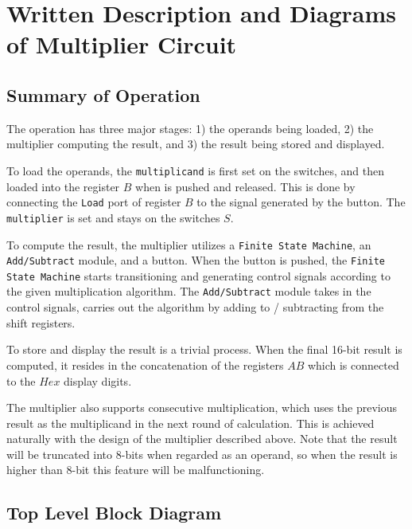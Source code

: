 \documentclass{article}
\begin{document}



\section{Written Description and Diagrams of Multiplier Circuit}
\label{sec:written-description}

\subsection{Summary of Operation}
The operation has three major stages: 1) the operands being loaded, 2) the multiplier computing the result, and 3) the result being stored and displayed.

To load the operands, the \texttt{multiplicand} is first set on the switches, and then loaded into the register $B$ when  is pushed and released. This is done by connecting the \texttt{Load} port of register $B$ to the signal generated by the button. The \texttt{multiplier} is set and stays on the switches $S$. 

To compute the result, the multiplier utilizes a \texttt{Finite State Machine}, an \texttt{Add/Subtract} module, and a  button. When the button is pushed, the \texttt{Finite State Machine} starts transitioning and generating control signals according to the given multiplication algorithm. The \texttt{Add/Subtract} module takes in the control signals, carries out the algorithm by adding to / subtracting from the shift registers.

To store and display the result is a trivial process. When the final 16-bit result is computed, it resides in the concatenation of the registers $AB$ which is connected to the $Hex$ display digits. 

The multiplier also supports consecutive multiplication, which uses the previous result as the multiplicand in the next round of calculation. This is achieved naturally with the design of the multiplier described above. Note that the result will be truncated into 8-bits when regarded as an operand, so when the result is higher than 8-bit this feature will be malfunctioning.


\subsection{Top Level Block Diagram}
\end{document}

